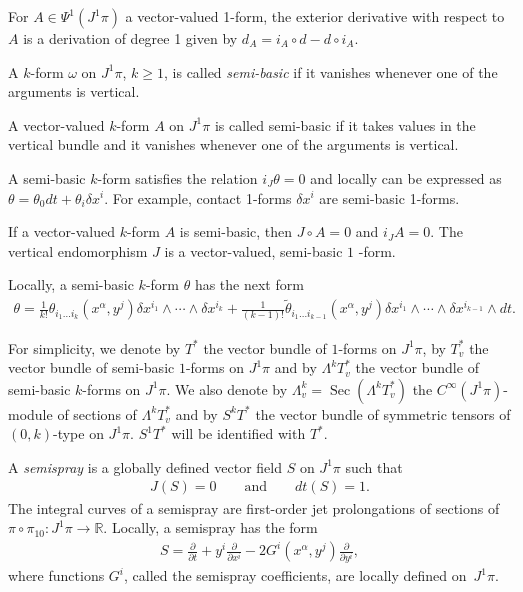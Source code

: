 \documentclass[11pt]{article}
\begin{document}
\begin{remark}
For $A\in\Psi^{1}(J^{1}\pi)$ a vector-valued 1-form, the exterior
derivative with respect to $A$ is a derivation of degree 1 given
by $d_{A}=i_{A}\circ d-d\circ i_{A}.$
\end{remark}
A $k$-form $\omega$ on $J^{1}\pi$, $k\geq1$, is called \emph{semi-basic}
if it vanishes whenever one of the arguments is vertical.

A vector-valued $k$-form $A$ on $J^{1}\pi$ is called semi-basic
if it takes values in the vertical bundle and it vanishes whenever
one of the arguments is vertical.

A semi-basic $k$-form satisf\/ies the relation $i_{J}\theta=0$ and
locally can be expressed as $\theta=\theta_{0}dt+\theta_{i}\delta x^{i}$.
For example, contact 1-forms $\delta x^{i}$ are semi-basic 1-forms.

If a vector-valued $k$-form $A$ is semi-basic, then $J\circ A=0$
and $i_{J}A=0$. The vertical endomorphism $J$ is a vector-valued,
semi-basic $1$ -form.

Locally, a semi-basic $k$-form $\theta$ has the next form \begin{eqnarray*}
\theta=\frac{1}{k!}\theta_{i_{1}\dots i_{k}}(x^{\alpha},y^{j})\delta x^{i_{1}}\wedge\cdots\wedge\delta x^{i_{k}}+\frac{1}{(k-1)!}\widetilde{\theta}_{i_{1}\dots i_{k-1}}(x^{\alpha},y^{j})\delta x^{i_{1}}\wedge\cdots\wedge\delta x^{i_{k-1}}\wedge dt.\end{eqnarray*}


For simplicity, we denote by $T^{*}$ the vector bundle of $1$-forms
on $J^{1}\pi$, by $T_{v}^{*}$ the vector bundle of semi-basic $1$-forms
on $J^{1}\pi$ and by $\Lambda^{k}T_{v}^{*}$ the vector bundle of
semi-basic $k$-forms on $J^{1}\pi$. We also denote by $\Lambda_{v}^{k}=\operatorname{Sec}\left(\Lambda^{k}T_{v}^{*}\right)$
the $C^{\infty}(J^{1}\pi)$-module of sections of $\Lambda^{k}T_{v}^{*}$
and by $S^{k}T^{*}$ the vector bundle of symmetric tensors of $(0,k)$-type
on $J^{1}\pi$. $S^{1}T^{*}$ will be identif\/ied with $T^{*}$.

A \emph{semispray} is a globally def\/ined vector f\/ield $S$ on $J^{1}\pi$
such that \begin{gather*}
J(S)=0\qquad\textrm{and}\qquad dt(S)=1.%
\end{gather*}
 The integral curves of a semispray are f\/irst-order jet prolongations
of sections of $\pi\circ\pi_{10}:\!  J^{1}\pi\!\rightarrow\!\mathbb{R}$.
Locally, a semispray has the form{\samepage \begin{gather}
S=\frac{\partial}{\partial t}+y^{i}\frac{\partial}{\partial x^{i}}-2G^{i}(x^{\alpha},y^{j})\frac{\partial}{\partial y^{i}},\label{eq:5}
\end{gather}
 where functions $G^{i}$, called the semispray coef\/f\/icients, are
locally def\/ined on~$J^{1}\pi$.}
\end{document}
